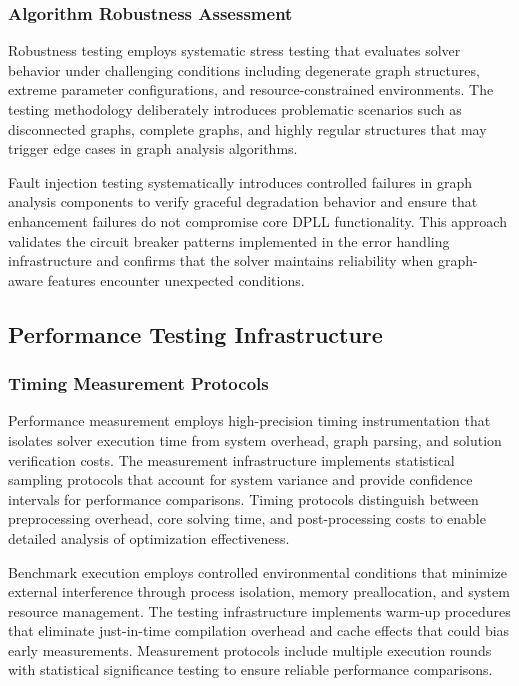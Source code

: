 \subsubsection{Algorithm Robustness Assessment}
Robustness testing employs systematic stress testing that evaluates solver behavior under challenging conditions including degenerate graph structures, extreme parameter configurations, and resource-constrained environments. The testing methodology deliberately introduces problematic scenarios such as disconnected graphs, complete graphs, and highly regular structures that may trigger edge cases in graph analysis algorithms.

Fault injection testing systematically introduces controlled failures in graph analysis components to verify graceful degradation behavior and ensure that enhancement failures do not compromise core DPLL functionality. This approach validates the circuit breaker patterns implemented in the error handling infrastructure and confirms that the solver maintains reliability when graph-aware features encounter unexpected conditions.

\subsection{Performance Testing Infrastructure}

\subsubsection{Timing Measurement Protocols}
Performance measurement employs high-precision timing instrumentation that isolates solver execution time from system overhead, graph parsing, and solution verification costs. The measurement infrastructure implements statistical sampling protocols that account for system variance and provide confidence intervals for performance comparisons. Timing protocols distinguish between preprocessing overhead, core solving time, and post-processing costs to enable detailed analysis of optimization effectiveness.

Benchmark execution employs controlled environmental conditions that minimize external interference through process isolation, memory preallocation, and system resource management. The testing infrastructure implements warm-up procedures that eliminate just-in-time compilation overhead and cache effects that could bias early measurements. Measurement protocols include multiple execution rounds with statistical significance testing to ensure reliable performance comparisons.

